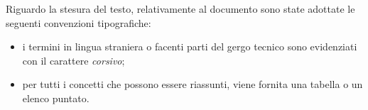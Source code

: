 Riguardo la stesura del testo, relativamente al documento sono state adottate le seguenti convenzioni tipografiche:
\begin{itemize}
	\item i termini in lingua straniera o facenti parti del gergo tecnico sono evidenziati con il carattere \emph{corsivo};
	\item per tutti i concetti che possono essere riassunti, viene fornita una tabella o un elenco puntato.
\end{itemize}